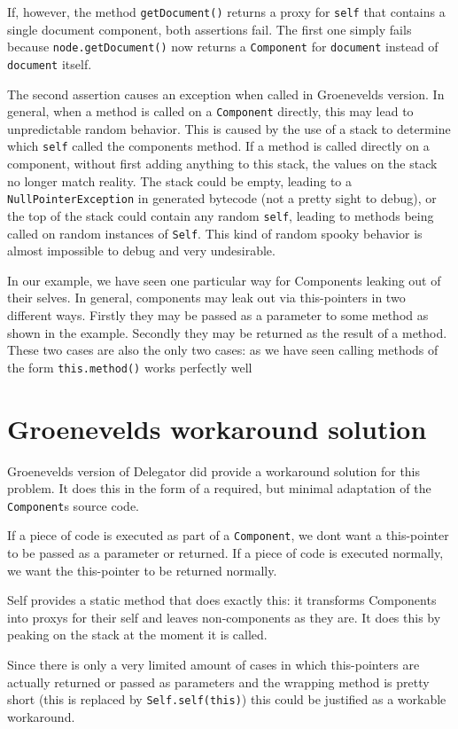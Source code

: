 \documentclass[a4paper,12pt]{book}
\begin{document}
If, however, the method \verb|getDocument()| returns a proxy for \verb|self| that contains a single document component, both assertions fail. The first one simply fails because \verb|node.getDocument()| now returns a \verb|Component| for \verb|document| instead of \verb|document| itself. 

The second assertion causes an exception when called in Groenevelds version. In general, when a method is called on a \verb|Component| directly, this may lead to unpredictable random behavior. This is caused by the use of a stack to determine which \verb|self| called the components method. If a method is called directly on a component, without first adding anything to this stack, the values on the stack no longer match reality. The stack could be empty, leading to a \verb|NullPointerException| in generated bytecode (not a pretty sight to debug), or the top of the stack could contain any random \verb|self|, leading to methods being called on  random instances of \verb|Self|. This kind of random spooky behavior is almost impossible to debug and very undesirable.

In our example, we have seen one particular way for Components leaking out of their selves. In general, components may leak out via this-pointers in two different ways. Firstly they may be passed as a parameter to some method as shown in the example. Secondly they may be returned as the result of a method. These two cases are also the only two cases: as we have seen calling methods of the form \verb|this.method()| works perfectly well

\section*{Groenevelds workaround solution}
Groenevelds version of Delegator did provide a workaround solution for this problem. It does this in the form of a required, but minimal adaptation of the \verb|Component|s source code.

If a piece of code is executed as part of a \verb|Component|, we dont want a this-pointer to be passed as a parameter or returned. If a piece of code is executed normally, we want the this-pointer to be returned normally.

Self provides a static method that does exactly this: it transforms Components into proxys for their self and leaves non-components as they are. It does this by peaking on the stack at the moment it is called.

Since there is only a very limited amount of cases in which this-pointers are actually returned or passed as parameters and the wrapping method is pretty short (this is replaced by \verb|Self.self(this)|) this could be justified as a workable workaround.
\end{document}

